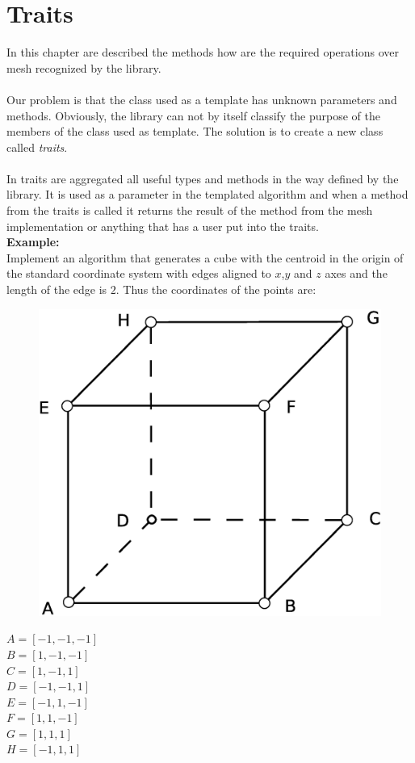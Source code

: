 \chapter{Traits}
\label{chap:traits}

In this chapter are described the methods how are the required operations over mesh
recognized by the library.\\
\\
Our problem is that the class used as a template has unknown parameters and
methods. Obviously, the library can not by itself classify the purpose of the members of
the class used as template. The solution is to create a new class called \emph{traits}.\\
\\
In traits are aggregated all useful types and methods in the way defined by the library.
It is used as a parameter in the templated algorithm and when a method from the traits is called it
returns the result of the method from the mesh implementation or anything that has
a user put into the traits.\\

\textbf{Example:}\\
Implement an algorithm that generates a cube with the centroid in the origin of
the standard coordinate system with edges aligned to $x$,$y$ and $z$ axes and the
length of the edge is $2$. Thus the coordinates of the points are:
\vspace{5mm}
\begin{multicols}{2}
\begin{figure}[H]
\centering
\includegraphics[width=0.6\linewidth]{../img/cube_example.eps}
\end{figure}
\columnbreak
\setlength{\parindent}{0cm}
$A = [-1,-1,-1]$\\
$B = [1,-1,-1]$\\
$C = [1,-1,1]$\\
$D = [-1,-1,1]$\\
$E = [-1,1,-1]$\\
$F = [1,1,-1]$\\
$G = [1,1,1]$\\
$H = [-1,1,1]$\\

\setlength{\parindent}{0.5cm}
\label{mcols:traits_example}

\end{multicols}

